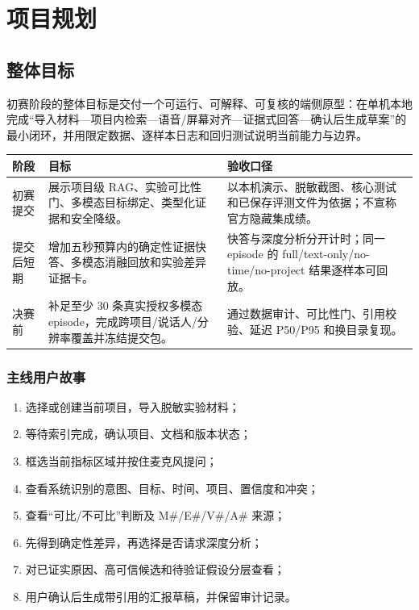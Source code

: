\documentclass[UTF8,12pt]{ctexart}
\begin{document}
\section{项目规划}

\subsection{整体目标}

初赛阶段的整体目标是交付一个可运行、可解释、可复核的端侧原型：在单机本地完成“导入材料—项目内检索—语音/屏幕对齐—证据式回答—确认后生成草案”的最小闭环，并用限定数据、逐样本日志和回归测试说明当前能力与边界。

\begin{center}
\small
\begin{tabularx}{\textwidth}{>{\raggedright\arraybackslash}p{}
  >{\raggedright\arraybackslash}p{}X}
\toprule
阶段 & 目标 & 验收口径\\
\midrule
初赛提交 & 展示项目级 RAG、实验可比性门、多模态目标绑定、类型化证据和安全降级。 & 以本机演示、脱敏截图、核心测试和已保存评测文件为依据；不宣称官方隐藏集成绩。\\
提交后短期 & 增加五秒预算内的确定性证据快答、多模态消融回放和实验差异证据卡。 & 快答与深度分析分开计时；同一 episode 的 full/text-only/no-time/no-project 结果逐样本可回放。\\
决赛前 & 补足至少 30 条真实授权多模态 episode，完成跨项目/说话人/分辨率覆盖并冻结提交包。 & 通过数据审计、可比性门、引用校验、延迟 P50/P95 和换目录复现。\\
\bottomrule
\end{tabularx}
\end{center}

\subsubsection{主线用户故事}
\begin{enumerate}
  \item 选择或创建当前项目，导入脱敏实验材料；
  \item 等待索引完成，确认项目、文档和版本状态；
  \item 框选当前指标区域并按住麦克风提问；
  \item 查看系统识别的意图、目标、时间、项目、置信度和冲突；
  \item 查看“可比/不可比”判断及 M\#/E\#/V\#/A\# 来源；
  \item 先得到确定性差异，再选择是否请求深度分析；
  \item 对已证实原因、高可信候选和待验证假设分层查看；
  \item 用户确认后生成带引用的汇报草稿，并保留审计记录。
\end{enumerate}
\end{document}
